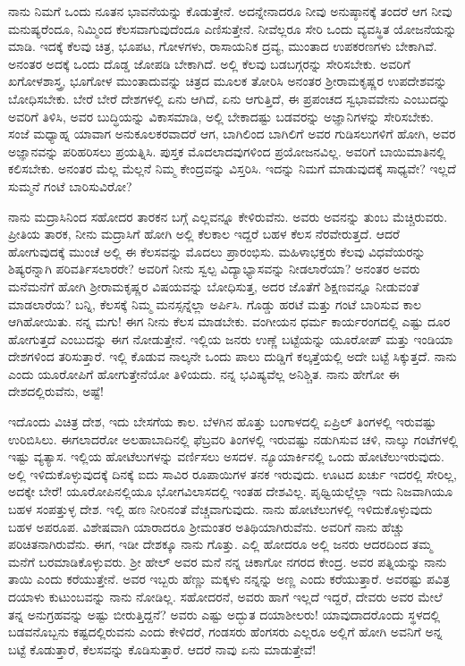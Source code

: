 ನಾನು ನಿಮಗೆ ಒಂದು ನೂತನ ಭಾವನೆಯನ್ನು ಕೊಡುತ್ತೇನೆ. ಅದನ್ನೇನಾದರೂ ನೀವು ಅನುಷ್ಠಾನಕ್ಕೆ ತಂದರೆ ಆಗ ನೀವು ಮನುಷ್ಯರೆಂದೂ, ನಿಮ್ಮಿಂದ ಕೆಲಸವಾಗುವುದೆಂದೂ ಎಣಿಸುತ್ತೇನೆ. ನೀವೆಲ್ಲರೂ ಸೇರಿ ಒಂದು ವ್ಯವಸ್ಥಿತ ಯೋಜನೆಯನ್ನು ಮಾಡಿ. ಇದಕ್ಕೆ ಕೆಲವು ಚಿತ್ರ, ಭೂಪಟ, ಗೋಳಗಳು, ರಾಸಾಯನಿಕ ದ್ರವ್ಯ, ಮುಂತಾದ ಉಪಕರಣಗಳು ಬೇಕಾಗಿವೆ. ಅನಂತರ ಅದಕ್ಕೆ ಒಂದು ದೊಡ್ಡ ಜೋಪಡಿ ಬೇಕಾಗಿದೆ. ಅಲ್ಲಿ ಕೆಲವು ಬಡಬಗ್ಗರನ್ನು ಸೇರಿಸಬೇಕು. ಅವರಿಗೆ ಖಗೋಳಶಾಸ್ತ್ರ, ಭೂಗೋಳ ಮುಂತಾದುವನ್ನು ಚಿತ್ರದ ಮೂಲಕ ತೋರಿಸಿ ಅನಂತರ ಶ‍್ರೀರಾಮಕೃಷ್ಣರ ಉಪದೇಶವನ್ನು ಬೋಧಿಸಬೇಕು. ಬೇರೆ ಬೇರೆ ದೇಶಗಳಲ್ಲಿ ಏನು ಆಗಿದೆ, ಏನು ಆಗುತ್ತಿದೆ, ಈ ಪ್ರಪಂಚದ ಸ್ವಭಾವವೇನು ಎಂಬುದನ್ನು ಅವರಿಗೆ ತಿಳಿಸಿ, ಅವರ ಬುದ್ಧಿಯನ್ನು ವಿಕಾಸಮಾಡಿ, ಅಲ್ಲಿ ಬೇಕಾದಷ್ಟು ಬಡವರನ್ನು ಅಜ್ಞಾನಿಗಳನ್ನು ಸೇರಿಸಬೇಕು. ಸಂಜೆ ಮಧ್ಯಾಹ್ನ ಯಾವಾಗ ಅನುಕೂಲಕರವಾದರೆ ಆಗ, ಬಾಗಿಲಿಂದ ಬಾಗಿಲಿಗೆ ಅವರ ಗುಡಿಸಲುಗಳಿಗೆ ಹೋಗಿ, ಅವರ ಅಜ್ಞಾನವನ್ನು ಪರಿಹರಿಸಲು ಪ್ರಯತ್ನಿಸಿ. ಪುಸ್ತಕ ಮೊದಲಾದವುಗಳಿಂದ ಪ್ರಯೋಜನವಿಲ್ಲ. ಅವರಿಗೆ ಬಾಯಿಮಾತಿನಲ್ಲಿ ಕಲಿಸಬೇಕು. ಅನಂತರ ಮೆಲ್ಲ ಮೆಲ್ಲನೆ ನಿಮ್ಮ ಕೇಂದ್ರವನ್ನು ವಿಸ್ತರಿಸಿ. ಇದನ್ನು ನಿಮಗೆ ಮಾಡುವುದಕ್ಕೆ ಸಾಧ್ಯವೇ? ಇಲ್ಲದೆ ಸುಮ್ಮನೆ ಗಂಟೆ ಬಾರಿಸುವಿರೋ?
\vspace{0.3cm}

ನಾನು ಮದ್ರಾಸಿನಿಂದ ಸಹೋದರ ತಾರಕನ ಬಗ್ಗೆ ಎಲ್ಲವನ್ನೂ ಕೇಳಿರುವೆನು. ಅವರು ಅವನನ್ನು ತುಂಬ ಮೆಚ್ಚಿರುವರು. ಪ್ರೀತಿಯ ತಾರಕ, ನೀನು ಮದ್ರಾಸಿಗೆ ಹೋಗಿ ಅಲ್ಲಿ ಕೆಲಕಾಲ ಇದ್ದರೆ ಬಹಳ ಕೆಲಸ ನೆರವೇರುತ್ತದೆ. ಆದರೆ ಹೋಗುವುದಕ್ಕೆ ಮುಂಚೆ ಅಲ್ಲಿ ಈ ಕೆಲಸವನ್ನು ಮೊದಲು ಪ್ರಾರಂಭಿಸು. ಮಹಿಳಾಭಕ್ತರು ಕೆಲವು ವಿಧವೆಯರನ್ನು ಶಿಷ್ಯರನ್ನಾಗಿ ಪರಿವರ್ತಿಸಲಾರರೇ? ಅವರಿಗೆ ನೀನು ಸ್ವಲ್ಪ ವಿದ್ಯಾಭ್ಯಾಸವನ್ನು ನೀಡಲಾರೆಯಾ? ಅನಂತರ ಅವರು ಮನೆಮನೆಗೆ ಹೋಗಿ ಶ‍್ರೀರಾಮಕೃಷ್ಣರ ವಿಷಯವನ್ನು ಬೋಧಿಸುತ್ತ, ಅದರ ಜೊತೆಗೆ ಶಿಕ್ಷಣವನ್ನೂ ನೀಡುವಂತೆ ಮಾಡಲಾರೆಯ? ಬನ್ನಿ, ಕೆಲಸಕ್ಕೆ ನಿಮ್ಮ ಮನಸ್ಸನ್ನೆಲ್ಲಾ ಅರ್ಪಿಸಿ. ಗೊಡ್ಡು ಹರಟೆ ಮತ್ತು ಗಂಟೆ ಬಾರಿಸುವ ಕಾಲ ಆಗಿಹೋಯಿತು. ನನ್ನ ಮಗು! ಈಗ ನೀನು ಕೆಲಸ ಮಾಡಬೇಕು. ವಂಗೀಯನ ಧರ್ಮ ಕಾರ್ಯರಂಗದಲ್ಲಿ ಎಷ್ಟು ದೂರ ಹೋಗುತ್ತದೆ ಎಂಬುದನ್ನು ಈಗ ನೋಡುತ್ತೇನೆ. ಇಲ್ಲಿಯ ಜನರು ಉಣ್ಣೆ ಬಟ್ಟೆಯನ್ನು ಯೂರೋಪ್ ಮತ್ತು ಇಂಡಿಯಾ ದೇಶಗಳಿಂದ ತರಿಸುತ್ತಾರೆ. ಇಲ್ಲಿ ಕೊಡುವ ನಾಲ್ಕನೇ ಒಂದು ಪಾಲು ದುಡ್ಡಿಗೆ ಕಲ್ಕತ್ತೆಯಲ್ಲಿ ಅದೇ ಬಟ್ಟೆ ಸಿಕ್ಕುತ್ತದೆ. ನಾನು ಎಂದು ಯೂರೋಪಿಗೆ ಹೋಗುತ್ತೇನೆಯೋ ತಿಳಿಯದು. ನನ್ನ ಭವಿಷ್ಯವೆಲ್ಲ ಅನಿಶ್ಚಿತ. ನಾನು ಹೇಗೋ ಈ ದೇಶದಲ್ಲಿರುವೆನು, ಅಷ್ಟೆ!
\vspace{0.2cm}

ಇದೊಂದು ವಿಚಿತ್ರ ದೇಶ, ಇದು ಬೇಸಗೆಯ ಕಾಲ. ಬೆಳಗಿನ ಹೊತ್ತು ಬಂಗಾಳದಲ್ಲಿ ಏಪ್ರಿಲ್ ತಿಂಗಳಲ್ಲಿ ಇರುವಷ್ಟು ಉರಿಬಿಸಿಲು. ಈಗಲಾದರೋ ಅಲಹಾಬಾದಿನಲ್ಲಿ ಫೆಬ್ರವರಿ ತಿಂಗಳಲ್ಲಿ ಇರುವಷ್ಟು ನಡುಗಿಸುವ ಚಳಿ, ನಾಲ್ಕು ಗಂಟೆಗಳಲ್ಲಿ ಇಷ್ಟು ವ್ಯತ್ಯಾಸ. ಇಲ್ಲಿಯ ಹೋಟೆಲುಗಳನ್ನು ವರ್ಣಿಸಲು ಅಸದಳ. ನ್ಯೂಯಾರ್ಕಿನಲ್ಲಿ ಒಂದು ಹೋಟೆಲು\break  ಇರುವುದು. ಅಲ್ಲಿ ಇಳಿದುಕೊಳ್ಳುವುದಕ್ಕೆ ದಿನಕ್ಕೆ ಐದು ಸಾವಿರ ರೂಪಾಯಿಗಳ ತನಕ ಇರುವುದು. ಊಟದ ಖರ್ಚು ಇದರಲ್ಲಿ ಸೇರಿಲ್ಲ, ಅದಕ್ಕೇ ಬೇರೆ! ಯೂರೋಪಿನಲ್ಲಿಯೂ ಭೋಗವಿಲಾಸದಲ್ಲಿ ಇಂತಹ ದೇಶವಿಲ್ಲ. ಪೃಥ್ವಿಯಲ್ಲೆಲ್ಲಾ ಇದು ನಿಜವಾಗಿಯೂ ಬಹಳ ಸಂಪತ್ತುಳ್ಳ ದೇಶ. ಇಲ್ಲಿ ಹಣ ನೀರಿನಂತೆ ವೆಚ್ಚವಾಗುವುದು. ನಾನು ಹೋಟೆಲುಗಳಲ್ಲಿ ಇಳಿದುಕೊಳ್ಳುವುದು ಬಹಳ ಅಪರೂಪ. ವಿಶೇಷವಾಗಿ ಯಾರಾದರೂ ಶ‍್ರೀಮಂತರ ಅತಿಥಿಯಾಗಿರುವೆನು. ಅವರಿಗೆ ನಾನು ಹೆಚ್ಚು ಪರಿಚಿತನಾಗಿರುವೆನು. ಈಗ, ಇಡೀ ದೇಶಕ್ಕೂ ನಾನು ಗೊತ್ತು. ಎಲ್ಲಿ ಹೋದರೂ ಅಲ್ಲಿ ಜನರು ಆದರದಿಂದ ತಮ್ಮ ಮನೆಗೆ ಬರಮಾಡಿಕೊಳ್ಳುವರು. ಶ‍್ರೀ ಹೇಲ್ ಅವರ ಮನೆ ನನ್ನ ಚಿಕಾಗೋ ನಗರದ ಕೇಂದ್ರ. ಅವರ ಪತ್ನಿಯನ್ನು ನಾನು ತಾಯಿ ಎಂದು ಕರೆಯುತ್ತೇನೆ. ಅವರ ಇಬ್ಬರು ಹೆಣ್ಣು ಮಕ್ಕಳು ನನ್ನನ್ನು ಅಣ್ಣ ಎಂದು ಕರೆಯುತ್ತಾರೆ. ಅವರಷ್ಟು ಪವಿತ್ರ ದಯಾಳು ಕುಟುಂಬವನ್ನು ನಾನು ನೋಡಿಲ್ಲ. ಸಹೋದರನೆ, ಅವರು ಹಾಗೆ ಇಲ್ಲದೆ ಇದ್ದರೆ, ದೇವರು ಅವರ ಮೇಲೆ ತನ್ನ ಅನುಗ್ರಹವನ್ನು ಅಷ್ಟು ಬೀರುತ್ತಿದ್ದನೆ? ಅವರು ಎಷ್ಟು ಅದ್ಭುತ ದಯಾಶೀಲರು! ಯಾವುದಾದರೊಂದು ಸ್ಥಳದಲ್ಲಿ ಬಡವನೊಬ್ಬನು ಕಷ್ಟದಲ್ಲಿರುವನು ಎಂದು ಕೇಳಿದರೆ, ಗಂಡಸರು ಹೆಂಗಸರು ಎಲ್ಲರೂ ಅಲ್ಲಿಗೆ ಹೋಗಿ ಅವನಿಗೆ ಅನ್ನ ಬಟ್ಟೆ ಕೊಡುತ್ತಾರೆ, ಕೆಲಸವನ್ನು ಕೊಡಿಸುತ್ತಾರೆ. ಆದರೆ ನಾವು ಏನು ಮಾಡುತ್ತೇವೆ!
\vspace{0.2cm}

